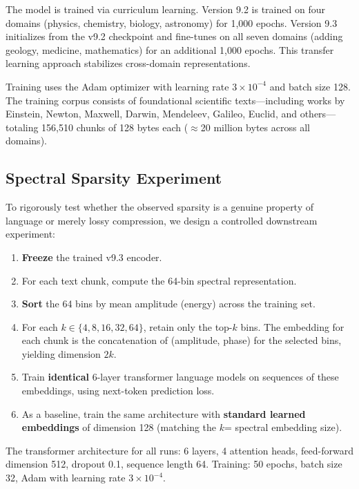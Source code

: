\documentclass[10pt,twocolumn]{article}
\begin{document}
The model is trained via curriculum learning. Version 9.2 is trained on four domains (physics, chemistry, biology, astronomy) for 1,000 epochs. Version 9.3 initializes from the v9.2 checkpoint and fine-tunes on all seven domains (adding geology, medicine, mathematics) for an additional 1,000 epochs. This transfer learning approach stabilizes cross-domain representations.

Training uses the Adam optimizer with learning rate $3 \times 10^{-4}$ and batch size 128. The training corpus consists of foundational scientific texts---including works by Einstein, Newton, Maxwell, Darwin, Mendeleev, Galileo, Euclid, and others---totaling 156,510 chunks of 128 bytes each ($\approx$20 million bytes across all domains).

\subsection{Spectral Sparsity Experiment}

To rigorously test whether the observed sparsity is a genuine property of language or merely lossy compression, we design a controlled downstream experiment:

\begin{enumerate}[leftmargin=*,nosep]
    \item \textbf{Freeze} the trained v9.3 encoder.
    \item For each text chunk, compute the 64-bin spectral representation.
    \item \textbf{Sort} the 64 bins by mean amplitude (energy) across the training set.
    \item For each $k \in \{4, 8, 16, 32, 64\}$, retain only the top-$k$ bins. The embedding for each chunk is the concatenation of (amplitude, phase) for the selected bins, yielding dimension $2k$.
    \item Train \textbf{identical} 6-layer transformer language models on sequences of these embeddings, using next-token prediction loss.
    \item As a baseline, train the same architecture with \textbf{standard learned embeddings} of dimension 128 (matching the $k$\!= spectral embedding size).
\end{enumerate}

The transformer architecture for all runs: 6 layers, 4 attention heads, feed-forward dimension 512, dropout 0.1, sequence length 64. Training: 50 epochs, batch size 32, Adam with learning rate $3 \times 10^{-4}$.
\end{document}
